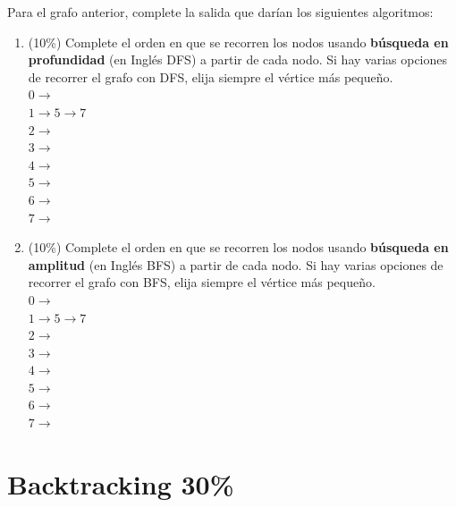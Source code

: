 \documentclass[twocolumn]{article}
\begin{document}
Para el grafo anterior, complete la salida
que darían los siguientes algoritmos:


\begin{enumerate}[label=\Alph*]
	\item (10\%) Complete el orden en que se recorren los nodos usando \textbf{búsqueda en profundidad} (en Inglés DFS) a partir de cada nodo. Si hay varias opciones de recorrer el grafo con DFS, elija siempre el vértice más pequeño.\\


$0 \rightarrow$\\
$1 \rightarrow 5 \rightarrow  7$\\
$2 \rightarrow$\\
$3 \rightarrow$\\
$4 \rightarrow$\\
$5 \rightarrow$\\
$6 \rightarrow$\\
$7 \rightarrow$\\


\item (10\%) Complete el orden en que se recorren los nodos usando \textbf{búsqueda en amplitud} (en Inglés BFS) a partir de cada nodo. Si hay varias opciones de recorrer el grafo con BFS, elija siempre el vértice más pequeño.\\


$0 \rightarrow$\\
$1 \rightarrow 5 \rightarrow  7$\\
$2 \rightarrow$\\
$3 \rightarrow$\\
$4 \rightarrow$\\
$5 \rightarrow$\\
$6 \rightarrow$\\
$7 \rightarrow$\\


\end{enumerate}


\section{Backtracking 30\%}
\end{document}
